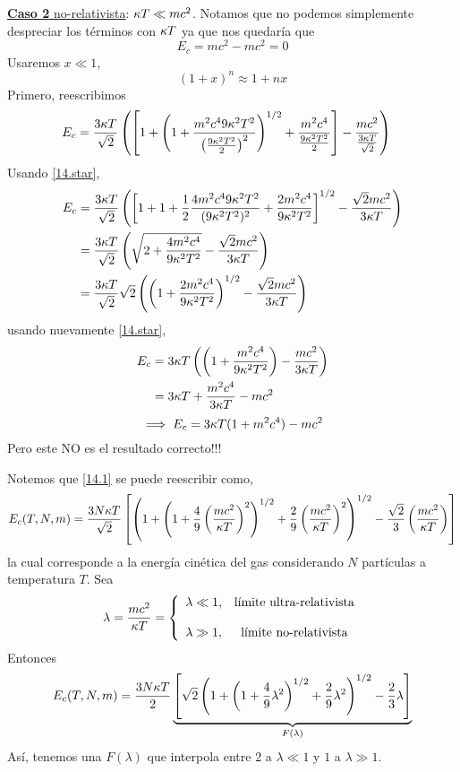 \begin{sol}
\underline{\textbf{Caso 2} no-relativista}: $\kappa T\ll mc^2$. Notamos que no podemos simplemente despreciar los términos con $\kappa T$ ya que nos quedaría que
\begin{equation}
  E_c=mc^2-mc^2=0
\end{equation}
Usaremos $x\ll 1$,
\begin{equation}\label{14.star}
  (1+x)^n\approx 1+nx
\end{equation}
Primero, reescribimos
\begin{align}
  E_c&=\frac{3\kappa T}{\sqrt{2}}\left(\left[1+\left(1+\frac{m^2c^49\kappa^2T^2}{\left(\frac{9\kappa^2T^2}{2}\right)^2}\right)^{1/2}+\frac{m^2c^4}{\frac{9\kappa^2T^2}{2}}\right]-\frac{mc^2}{\frac{3\kappa T}{\sqrt{2}}}\right)
\end{align}
Usando \eqref{14.star},
\begin{align}
   E_c&=\frac{3\kappa T}{\sqrt{2}}\left(\left[1+1+\frac{1}{2}\frac{4m^2c^49\kappa^2T^2}{(9\kappa^2T^2)^2}+\frac{2m^2c^4}{9\kappa^2T^2	}\right]^{1/2}-\frac{\sqrt{2}mc^2}{3\kappa T}\right)\\
   &=\frac{3\kappa T}{\sqrt{2}}\left(\sqrt{2+\frac{4m^2c^4}{9\kappa^2T^2}}-\frac{\sqrt{2}mc^2}{3\kappa T}\right)\\
   &=\frac{3\kappa T}{\sqrt{2}}\sqrt{2}\left(\left(1+\frac{2m^2c^4}{9\kappa^2T^2}\right)^{1/2}-\frac{\sqrt{2}mc^2}{3\kappa T}\right)
\end{align}
usando nuevamente \eqref{14.star},
\begin{align}
   E_c&=3\kappa T\left(\left(1+\frac{m^2c^4}{9\kappa^2T^2}\right)-\frac{mc^2}{3\kappa T}\right)\\
   &=3\kappa T+\frac{m^2c^4}{3\kappa T}-mc^2
\end{align}
\begin{equation}
	\implies E_c=3\kappa T(1+m^2c^4)-mc^2
\end{equation}
Pero este NO es el resultado correcto!!!

Notemos que \eqref{14.1} se puede reescribir como,
\begin{equation*}
  E_c(T,N,m)=\frac{3N\kappa T}{\sqrt{2}}\left[\left(1+\left(1+\frac{4}{9}\left(\frac{mc^2}{\kappa T}\right)^2\right)^{1/2}+\frac{2}{9}\left(\frac{mc^2}{\kappa T}\right)^2\right)^{1/2}-\frac{\sqrt{2}}{3}\left(\frac{mc^2}{\kappa T}\right)\right]
\end{equation*}
la cual corresponde a la energía cinética del gas considerando $N$ partículas a temperatura $T$. Sea
\begin{equation}
  \lambda=\frac{mc^2}{\kappa T}=\left\{\begin{array}{cc}
  	\lambda \ll 1,& \text{límite ultra-relativista}\\\\
  	\lambda\gg 1,&\text{límite no-relativista}
  \end{array}\right.
\end{equation}
Entonces
\begin{equation}
  E_c(T,N,m)=\frac{3N\kappa T}{2}\underbrace{\left[\sqrt{2}\left(1+\left(1+\frac{4}{9}\lambda^2\right)^{1/2}+\frac{2}{9}\lambda^2\right)^{1/2}-\frac{2}{3}\lambda\right]}_{F(\lambda)}
\end{equation}
Así, tenemos una $F(\lambda)$ que interpola entre $2$ a $\lambda\ll 1$ y $1$ a $\lambda\gg 1$.


\end{sol}
